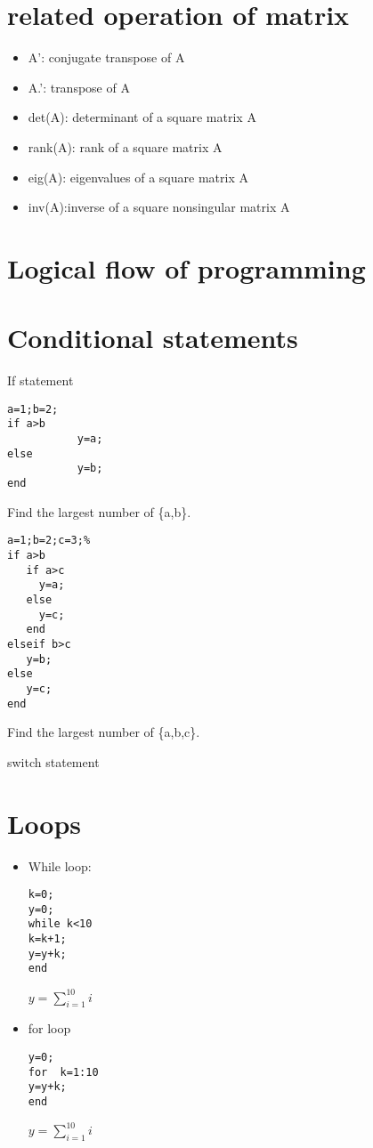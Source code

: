 \documentclass{article}
\begin{document}
 \section{related operation of matrix}
   \begin{itemize}
     \item A’: conjugate transpose of A
           \item A.': transpose of A
     \item det(A): determinant of a square matrix A
     \item rank(A): rank of a square matrix A
     \item eig(A): eigenvalues of a square matrix A
     \item inv(A):inverse of a square nonsingular matrix A
   \end{itemize}
 
 \section{Logical flow of programming}
 
 \section{Conditional statements}
      If statement
\begin{lstlisting}
a=1;b=2;
if a>b
           y=a;
else
           y=b;
end
\end{lstlisting}
 Find the largest number of \{a,b\}.
  \begin{lstlisting}
a=1;b=2;c=3;%
if a>b
   if a>c
     y=a;
   else
     y=c;
   end
elseif b>c
   y=b;
else
   y=c;
end
\end{lstlisting}
    Find the largest number of \{a,b,c\}.
                 
      switch statement
 

 
 \section{Loops}
   \begin{itemize}
     \item While loop:
\begin{lstlisting}
k=0;
y=0;
while k<10
k=k+1;
y=y+k;
end
\end{lstlisting}
           $y=\sum_{i=1}^{10}i$
     \item for loop
\begin{lstlisting}
y=0;
for  k=1:10
y=y+k;
end
\end{lstlisting}
           $y=\sum_{i=1}^{10}i$
   \end{itemize}
 
\end{document}
